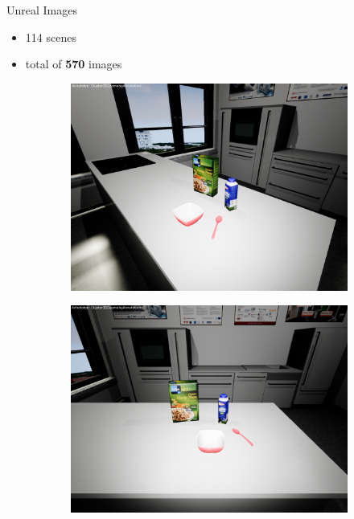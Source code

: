 \documentclass[]{beamer}
\begin{document}
\begin{frame}{Unreal Images}
	\begin{itemize}
		\item 114 scenes
		\item total of \textbf{570} images
	\end{itemize}
	\begin{figure}
\centering
	\begin{subfigure}[b]{0.3\textwidth}
		\includegraphics[scale=.08]{../thesis/img/chapter3/sceneEx_1}
	\end{subfigure}
	\quad
	\begin{subfigure}[b]{0.3\textwidth}
		\includegraphics[scale=.08]{../thesis/img/chapter3/sceneEx_2}	
	\end{subfigure}

\end{figure}
\end{frame}
\end{document}

